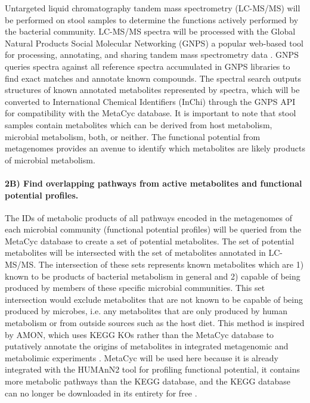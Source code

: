 \documentclass[11pt]{article}
\begin{document}
Untargeted liquid chromatography tandem mass spectrometry (LC-MS/MS) will be performed on stool samples to determine the functions actively performed by the bacterial community.
LC-MS/MS spectra will be processed with the Global Natural Products Social Molecular Networking (GNPS) a popular web-based tool for processing, annotating, and sharing tandem mass spectrometry data \cite{wang_sharing_2016}.
GNPS queries spectra against all reference spectra accumulated in GNPS libraries to find exact matches and annotate known compounds.
The spectral search outputs structures of known annotated metabolites represented by spectra, which will be converted to International Chemical Identifiers (InChi) through the GNPS API for compatibility with the MetaCyc database.
It is important to note that stool samples contain metabolites which can be derived from host metabolism, microbial metabolism, both, or neither.
The functional potential from metagenomes provides an avenue to identify which metabolites are likely products of microbial metabolism.

\paragraph{2B) Find overlapping pathways from active metabolites and functional potential profiles.}

The IDs of metabolic products of all pathways encoded in the metagenomes of each microbial community (functional potential profiles) will be queried from the MetaCyc database to create a set of potential metabolites.
The set of potential metabolites will be intersected with the set of metabolites annotated in LC-MS/MS.
The intersection of these sets represents known metabolites which are 1) known to be products of bacterial metabolism in general and 2) capable of being produced by members of these specific microbial communities.
This set intersection would exclude metabolites that are not known to be capable of being produced by microbes, i.e. any metabolites that are only produced by human metabolism or from outside sources such as the host diet.
This method is inspired by AMON, which uses KEGG KOs rather than the MetaCyc database to putatively annotate the origins of metabolites in integrated metagenomic and metabolimic experiments \cite{shaffer_amon_2019}.
MetaCyc will be used here because it is already integrated with the HUMAnN2 tool for profiling functional potential, it contains more metabolic pathways than the KEGG database, and the KEGG database can no longer be downloaded in its entirety for free \cite{caspi_metacyc_2020}.
\end{document}
